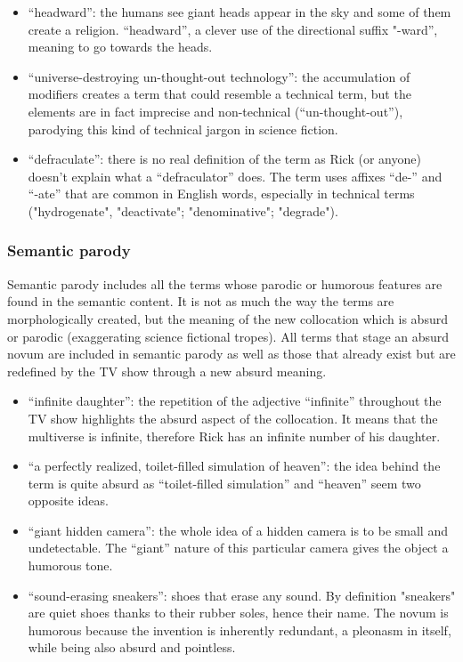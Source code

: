 \documentclass[output=paper]{langscibook}
\begin{document}
\begin{itemize}
\item “headward”: the humans see giant heads appear in the sky and some of them create a religion. “headward”, a clever use of the directional suffix "-ward”, meaning to go towards the heads.
\item “universe-destroying un-thought-out technology”: the accumulation of modifiers creates a term that could resemble a technical term, but the elements are in fact imprecise and non-technical (“un-thought-out”), parodying this kind of technical jargon in science fiction.
\item “defraculate”: there is no real definition of the term as Rick (or anyone) doesn’t explain what a “defraculator” does. The term uses affixes “de-” and “-ate” that are common in English words, especially in technical terms ("hydrogenate", "deactivate"; "denominative"; "degrade").
\end{itemize}

\subsubsection{Semantic parody}

Semantic parody includes all the terms whose parodic or humorous features are found in the semantic content. It is not as much the way the terms are morphologically created, but the meaning of the new collocation which is absurd or parodic (exaggerating science fictional tropes). All terms that stage an absurd novum are included in semantic parody as well as those that already exist but are redefined by the TV show through a new absurd meaning.

\begin{itemize}
\item “infinite daughter”: the repetition of the adjective “infinite” throughout the TV show highlights the absurd aspect of the collocation. It means that the multiverse is infinite, therefore Rick has an infinite number of his daughter.
\item “a perfectly realized, toilet-filled simulation of heaven”: the idea behind the term is quite absurd as “toilet-filled simulation” and “heaven” seem two opposite ideas.
\item “giant hidden camera”: the whole idea of a hidden camera is to be small and undetectable. The “giant” nature of this particular camera gives the object a humorous tone.
\item “sound-erasing sneakers”: shoes that erase any sound. By definition "sneakers" are quiet shoes thanks to their rubber soles, hence their name. The novum is humorous because the invention is inherently redundant, a pleonasm in itself, while being also absurd and pointless.
\end{itemize}
\end{document}
